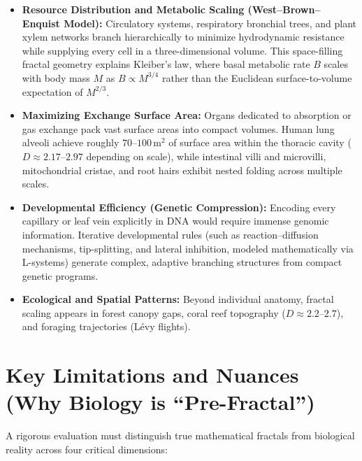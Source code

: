 \documentclass[11pt,a4paper]{article}
\begin{document}
\begin{itemize}[leftmargin=1.5em]
    \item \textbf{Resource Distribution and Metabolic Scaling (West--Brown--Enquist Model):} Circulatory systems, respiratory bronchial trees, and plant xylem networks branch hierarchically to minimize hydrodynamic resistance while supplying every cell in a three-dimensional volume. This space-filling fractal geometry explains Kleiber's law, where basal metabolic rate $B$ scales with body mass $M$ as $B \propto M^{3/4}$ rather than the Euclidean surface-to-volume expectation of $M^{2/3}$.
    \item \textbf{Maximizing Exchange Surface Area:} Organs dedicated to absorption or gas exchange pack vast surface areas into compact volumes. Human lung alveoli achieve roughly $70\text{--}100\,\text{m}^2$ of surface area within the thoracic cavity ($D \approx 2.17\text{--}2.97$ depending on scale), while intestinal villi and microvilli, mitochondrial cristae, and root hairs exhibit nested folding across multiple scales.
    \item \textbf{Developmental Efficiency (Genetic Compression):} Encoding every capillary or leaf vein explicitly in DNA would require immense genomic information. Iterative developmental rules (such as reaction--diffusion mechanisms, tip-splitting, and lateral inhibition, modeled mathematically via L-systems) generate complex, adaptive branching structures from compact genetic programs.
    \item \textbf{Ecological and Spatial Patterns:} Beyond individual anatomy, fractal scaling appears in forest canopy gaps, coral reef topography ($D \approx 2.2\text{--}2.7$), and foraging trajectories (L\'evy flights).
\end{itemize}

\section{Key Limitations and Nuances (Why Biology is ``Pre-Fractal'')}
A rigorous evaluation must distinguish true mathematical fractals from biological reality across four critical dimensions:
\end{document}
